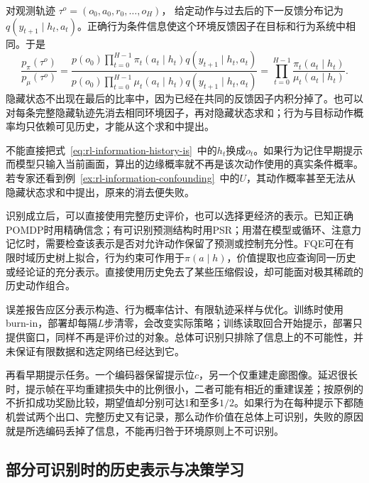 对观测轨迹
$\tau^o=(o_0,a_0,r_0,\ldots,o_H)$，
给定动作与过去后的下一反馈分布记为$q(y_{t+1}\mid h_t,a_t)$。正确行为条件信息使这个环境反馈因子在目标和行为系统中相同。于是
\begin{equation}
  \label{eq:rl-information-history-is}
  \frac{p_\pi(\tau^o)}{p_\mu(\tau^o)}
   =\frac{p(o_0)\prod_{t=0}^{H-1}
                  \pi_t(a_t\mid h_t)q(y_{t+1}\mid h_t,a_t)}
          {p(o_0)\prod_{t=0}^{H-1}
                  \mu_t(a_t\mid h_t)q(y_{t+1}\mid h_t,a_t)}
   =\prod_{t=0}^{H-1}\frac{\pi_t(a_t\mid h_t)}
                              {\mu_t(a_t\mid h_t)}.
\end{equation}
隐藏状态不出现在最后的比率中，因为已经在共同的反馈因子内积分掉了。也可以对每条完整隐藏轨迹先消去相同环境因子，再对隐藏状态求和；行为与目标动作概率均只依赖可见历史，才能从这个求和中提出。

不能直接把式~\eqref{eq:rl-information-history-is}~中的$h_t$换成$o_t$。如果行为记住早期提示而模型只输入当前画面，算出的边缘概率就不再是该次动作使用的真实条件概率。若专家还看到例~\ref{ex:rl-information-confounding}~中的$U$，其动作概率甚至无法从隐藏状态求和中提出，原来的消去便失败。

识别成立后，可以直接使用完整历史评价，也可以选择更经济的表示。已知正确POMDP时用精确信念；有可识别预测结构时用PSR；用潜在模型或循环、注意力记忆时，需要检查该表示是否对允许动作保留了预测或控制充分性。FQE可在有限时域历史树上拟合，行为约束可作用于$\pi(a\mid h)$，价值提取也应查询同一历史或经论证的充分表示。直接使用历史免去了某些压缩假设，却可能面对极其稀疏的历史动作组合。

误差报告应区分表示构造、行为概率估计、有限轨迹采样与优化。训练时使用burn-in，部署却每隔$L$步清零，会改变实际策略；训练读取回合开始提示，部署只提供窗口，同样不再是评价过的对象。总体可识别只排除了信息上的不可能性，并未保证有限数据和选定网络已经达到它。

再看早期提示任务。一个编码器保留提示位$c$，另一个仅重建走廊图像。延迟很长时，提示帧在平均重建损失中的比例很小，二者可能有相近的重建误差；按原例的不折扣成功奖励比较，期望值却分别可达1和至多$1/2$。如果行为在每种提示下都随机尝试两个出口、完整历史又有记录，那么动作价值在总体上可识别，失败的原因就是所选编码丢掉了信息，不能再归咎于环境原则上不可识别。

\subsection{部分可识别时的历史表示与决策学习}
\label{sec:rl-information-partial-identification}


